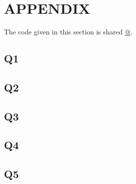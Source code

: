 \documentclass[11pt]{extarticle}
\begin{document}
\pagebreak
\section{APPENDIX}
The code given in this section is shared \href{https://github.com/kutay-ugurlu/Pattern-Recognition/tree/master/HW2}{@\faGithubSquare}.
\subsection{Q1}\label{subsec:Q1_code}

\pagebreak
\subsection{Q2} \label{subsec:Q2_code}

\pagebreak
\subsection{Q3}\label{subsec:Q3_code}

\pagebreak
\subsection{Q4}\label{subsec:Q4_code}

\pagebreak
\subsection{Q5}\label{subsec:Q5_code}

\end{document}
